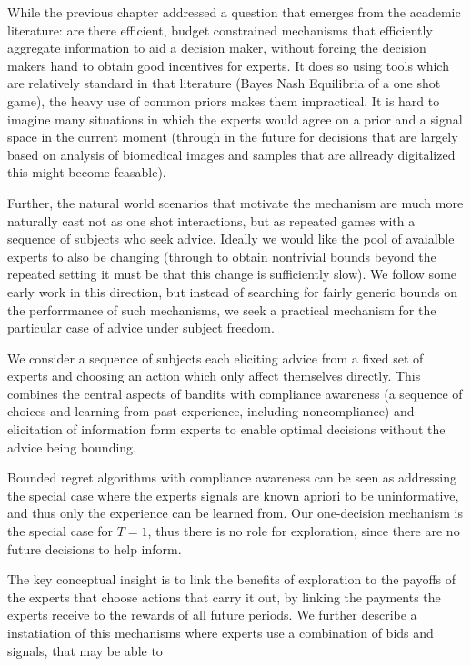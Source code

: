 

While the previous chapter addressed a question that emerges from the academic literature: are there efficient, budget constrained mechanisms that efficiently aggregate information to aid a decision maker, without forcing the decision makers hand to obtain good incentives for experts. It does so using tools which are relatively standard in that literature (Bayes Nash Equilibria of a one shot game), the heavy use of common priors makes them impractical. It is hard to imagine many situations in which the experts would agree on a prior and a signal space in the current moment (through in the future for decisions that are largely based on analysis of biomedical images and samples that are allready digitalized this might become feasable). 

Further, the natural world scenarios that motivate the mechanism are much more naturally cast not as one shot interactions, but as repeated games with a sequence of subjects who seek advice. Ideally we would like the pool of avaialble experts to also be changing (through to obtain nontrivial bounds beyond the repeated setting it must be that this change is sufficiently slow). We follow some early work in this direction, but instead of searching for fairly generic bounds on the perforrmance of such mechanisms, we seek a practical mechanism for the particular case of advice under subject freedom.

We consider a sequence of subjects each eliciting advice from a fixed set of experts and choosing an action which only affect themselves directly. This combines the central aspects of bandits with compliance awareness (a sequence of choices and learning from past experience, including noncompliance) and elicitation of information form experts to enable optimal decisions without the advice being bounding. 

Bounded regret algorithms with compliance awareness can be seen as addressing the special case where the experts signals are known apriori to be uninformative, and thus only the experience can be learned from. Our one-decision mechanism is the special case for $T={1}$, thus there is no role for exploration, since there are no future decisions  to help inform.

The key conceptual insight is to link the benefits of exploration to the payoffs of the experts that choose actions that carry it out, by linking the payments the experts receive to the rewards of all future periods.
We further describe a instatiation of this mechanisms where experts use a combination of bids and signals, that may be able to 

